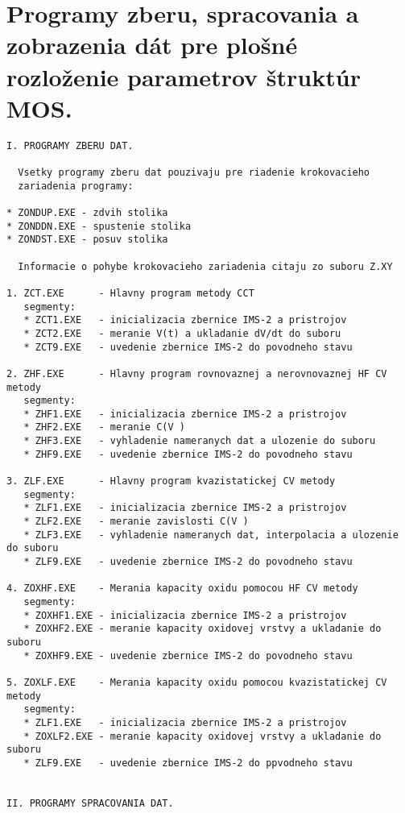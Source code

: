
\chapter{Programy zberu, spracovania a zobrazenia dát pre plošné rozloženie parametrov štruktúr MOS.}\label{app:AppendixH}

\begin{verbatim}
I. PROGRAMY ZBERU DAT.

  Vsetky programy zberu dat pouzivaju pre riadenie krokovacieho
  zariadenia programy:

* ZONDUP.EXE - zdvih stolika
* ZONDDN.EXE - spustenie stolika
* ZONDST.EXE - posuv stolika

  Informacie o pohybe krokovacieho zariadenia citaju zo suboru Z.XY

1. ZCT.EXE      - Hlavny program metody CCT
   segmenty:
   * ZCT1.EXE   - inicializacia zbernice IMS-2 a pristrojov
   * ZCT2.EXE   - meranie V(t) a ukladanie dV/dt do suboru
   * ZCT9.EXE   - uvedenie zbernice IMS-2 do povodneho stavu

2. ZHF.EXE      - Hlavny program rovnovaznej a nerovnovaznej HF CV metody
   segmenty:
   * ZHF1.EXE   - inicializacia zbernice IMS-2 a pristrojov
   * ZHF2.EXE   - meranie C(V )
   * ZHF3.EXE   - vyhladenie nameranych dat a ulozenie do suboru
   * ZHF9.EXE   - uvedenie zbernice IMS-2 do povodneho stavu

3. ZLF.EXE      - Hlavny program kvazistatickej CV metody
   segmenty:
   * ZLF1.EXE   - inicializacia zbernice IMS-2 a pristrojov
   * ZLF2.EXE   - meranie zavislosti C(V )
   * ZLF3.EXE   - vyhladenie nameranych dat, interpolacia a ulozenie do suboru
   * ZLF9.EXE   - uvedenie zbernice IMS-2 do povodneho stavu

4. ZOXHF.EXE    - Merania kapacity oxidu pomocou HF CV metody
   segmenty:
   * ZOXHF1.EXE - inicializacia zbernice IMS-2 a pristrojov
   * ZOXHF2.EXE - meranie kapacity oxidovej vrstvy a ukladanie do suboru
   * ZOXHF9.EXE - uvedenie zbernice IMS-2 do povodneho stavu

5. ZOXLF.EXE    - Merania kapacity oxidu pomocou kvazistatickej CV metody
   segmenty:
   * ZLF1.EXE   - inicializacia zbernice IMS-2 a pristrojov
   * ZOXLF2.EXE - meranie kapacity oxidovej vrstvy a ukladanie do suboru
   * ZLF9.EXE   - uvedenie zbernice IMS-2 do ppvodneho stavu


II. PROGRAMY SPRACOVANIA DAT.


\end{verbatim}
